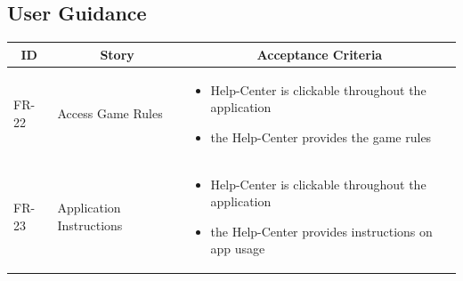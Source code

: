 \subsection{User Guidance}
\begin{tabular} { | m{1.25cm} | m{5.75cm} | m{6cm} | }
    \hline
    \multicolumn{1}{|c|}{ \textbf{ID}} & \multicolumn{1}{|c|}{ \textbf{Story} } & \multicolumn{1}{|c|}{ \textbf{Acceptance Criteria} } \\
    \hline
    FR-22 & Access Game Rules & \begin{itemize}[-]
        \item Help-Center is clickable throughout the application
        \item the Help-Center provides the game rules
    \end{itemize}\\
    \hline
    FR-23 & Application Instructions & \begin{itemize}[-]
        \item Help-Center is clickable throughout the application
        \item the Help-Center provides instructions on app usage
    \end{itemize}\\
    \hline
\end{tabular}

